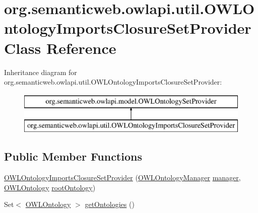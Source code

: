 \hypertarget{classorg_1_1semanticweb_1_1owlapi_1_1util_1_1_o_w_l_ontology_imports_closure_set_provider}{\section{org.\-semanticweb.\-owlapi.\-util.\-O\-W\-L\-Ontology\-Imports\-Closure\-Set\-Provider Class Reference}
\label{classorg_1_1semanticweb_1_1owlapi_1_1util_1_1_o_w_l_ontology_imports_closure_set_provider}
}
Inheritance diagram for org.\-semanticweb.\-owlapi.\-util.\-O\-W\-L\-Ontology\-Imports\-Closure\-Set\-Provider\-:\begin{figure}[H]
\begin{center}
\leavevmode
\includegraphics[height=2.000000cm]{classorg_1_1semanticweb_1_1owlapi_1_1util_1_1_o_w_l_ontology_imports_closure_set_provider}
\end{center}
\end{figure}
\subsection*{Public Member Functions}
\begin{DoxyCompactItemize}
\item 
\hyperlink{classorg_1_1semanticweb_1_1owlapi_1_1util_1_1_o_w_l_ontology_imports_closure_set_provider_a409b4139e0220e33bcda3d1667ac064f}{O\-W\-L\-Ontology\-Imports\-Closure\-Set\-Provider} (\hyperlink{interfaceorg_1_1semanticweb_1_1owlapi_1_1model_1_1_o_w_l_ontology_manager}{O\-W\-L\-Ontology\-Manager} \hyperlink{classorg_1_1semanticweb_1_1owlapi_1_1util_1_1_o_w_l_ontology_imports_closure_set_provider_a7c67738303fa5ecfad7bc8e4453ace31}{manager}, \hyperlink{interfaceorg_1_1semanticweb_1_1owlapi_1_1model_1_1_o_w_l_ontology}{O\-W\-L\-Ontology} \hyperlink{classorg_1_1semanticweb_1_1owlapi_1_1util_1_1_o_w_l_ontology_imports_closure_set_provider_ae8ead5c763d1a12663824ad7786f3b82}{root\-Ontology})
\item 
Set$<$ \hyperlink{interfaceorg_1_1semanticweb_1_1owlapi_1_1model_1_1_o_w_l_ontology}{O\-W\-L\-Ontology} $>$ \hyperlink{classorg_1_1semanticweb_1_1owlapi_1_1util_1_1_o_w_l_ontology_imports_closure_set_provider_a8abd2a1b489a517d90e18e4cb01c8132}{get\-Ontologies} ()
\end{DoxyCompactItemize}
